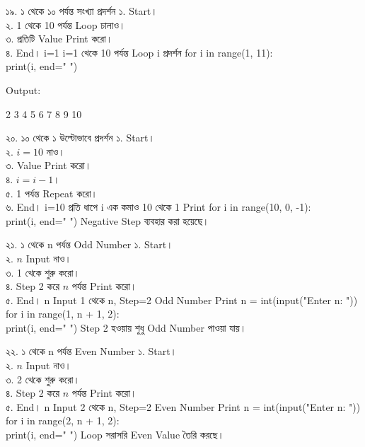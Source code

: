 
\exerciseTable
{১৯. ১ থেকে ১০ পর্যন্ত সংখ্যা প্রদর্শন}
{
১. Start।\\
২. 1 থেকে 10 পর্যন্ত Loop চালাও।\\
৩. প্রতিটি Value Print করো।\\
৪. End।
}
{
\linearflow
{i=1}
{i=1 থেকে 10 পর্যন্ত Loop}
{i প্রদর্শন}
}
{
for i in range(1, 11):\\
\hspace*{4mm}print(i, end=" ")
}
{
Output:

\textenglish{ 2 3 4 5 6 7 8 9 10}
}


\exerciseTable
{২০. ১০ থেকে ১ উল্টোভাবে প্রদর্শন}
{
১. Start।\\
২. \(i=10\) নাও।\\
৩. Value Print করো।\\
৪. \(i=i-1\)।\\
৫. 1 পর্যন্ত Repeat করো।\\
৬. End।
}
{
\linearflow
{i=10}
{প্রতি ধাপে i এক কমাও}
{10 থেকে 1 Print}
}
{
for i in range(10, 0, -1):\\
\hspace*{4mm}print(i, end=" ")
}
{
Negative Step ব্যবহার করা হয়েছে।
}


\exerciseTable
{২১. ১ থেকে n পর্যন্ত Odd Number}
{
১. Start।\\
২. \(n\) Input নাও।\\
৩. 1 থেকে শুরু করো।\\
৪. Step 2 করে \(n\) পর্যন্ত Print করো।\\
৫. End।
}
{
\linearflow
{n Input}
{1 থেকে n, Step=2}
{Odd Number Print}
}
{
n = int(input("Enter n: "))\\
for i in range(1, n + 1, 2):\\
\hspace*{4mm}print(i, end=" ")
}
{
Step 2 হওয়ায় শুধু Odd Number পাওয়া যায়।
}


\exerciseTable
{২২. ১ থেকে n পর্যন্ত Even Number}
{
১. Start।\\
২. \(n\) Input নাও।\\
৩. 2 থেকে শুরু করো।\\
৪. Step 2 করে \(n\) পর্যন্ত Print করো।\\
৫. End।
}
{
\linearflow
{n Input}
{2 থেকে n, Step=2}
{Even Number Print}
}
{
n = int(input("Enter n: "))\\
for i in range(2, n + 1, 2):\\
\hspace*{4mm}print(i, end=" ")
}
{
Loop সরাসরি Even Value তৈরি করছে।
}

